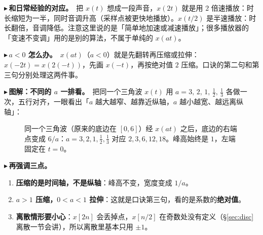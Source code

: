 \documentclass[UTF8,a4paper,11pt]{ctexart}
\newcounter{ex}[section]
\newcommand{\point}[1]{\par\addvspace{1ex}\noindent\textcolor{ptteal}{$\blacktriangleright$\,\textbf{#1}}\ }
\renewcommand{\paragraph}[1]{\point{#1}}
\begin{document}
\paragraph{和日常经验的对应。}把 $x(t)$ 想成一段声音，$x(2t)$ 就是用 $2$ 倍速播放：时长缩短为一半，同时音调升高（采样点被更快地播放）。$x(t/2)$ 是半速播放：时长翻倍，音调降低。注意这里说的是「简单地加速或减速播放」；很多播放器的「变速不变调」用的是别的算法，不属于单纯的 $x(at)$。

\paragraph{$a<0$ 怎么办。}$x(at)$（$a<0$）就是先翻转再压缩或拉伸：$x(-2t)=x(2(-t))$，先画 $x(-t)$，再按绝对值 $2$ 压缩。口诀的第二句和第三句分别处理这两件事。

\paragraph{图解：不同的 $a$ 一排看。}把同一个三角波 $x(t)$ 用 $a=3,\,2,\,1,\,\tfrac12,\,\tfrac13$ 各做一次，五行对齐，一眼看出「$a$ 越大越窄、越靠近纵轴，$a$ 越小越宽、越远离纵轴」：

\begin{figure}[H]
\centering
{}
\caption{同一个三角波（原来的底边在 $[0,6]$）经 $x(at)$ 之后，底边的右端点变成 $6/a$：$a=3,2,1,\tfrac12,\tfrac13$ 对应 $2,3,6,12,18$。峰高始终是 $1$，左端固定在 $t=0$。}
\end{figure}

\paragraph{再强调三点。}
\begin{enumerate}[nosep]
\item \textbf{压缩的是时间轴，不是纵轴}：峰高不变，宽度变成 $1/a$。
\item \textbf{$a>1$ 压缩，$0<a<1$ 拉伸}：这就是口诀第三句，看的是系数的\textbf{绝对值}。
\item \textbf{离散情形要小心}：$x[2n]$ 会丢掉点，$x[n/2]$ 在奇数处没有定义（\S\ref{sec:disc} 离散一节会讲），所以离散里基本只用 $\pm1$。
\end{enumerate}
\end{document}
